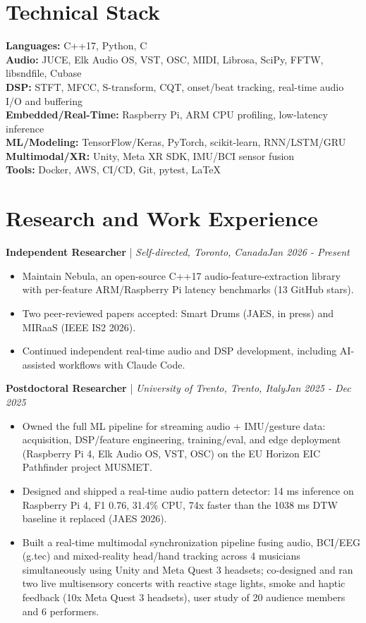 \documentclass[11pt]{article}
\newenvironment{cvrole}[5]{%
  \par\noindent\textbf{\large #1} | \textit{\small #2, #3}\hfill \textit{\small #4 - #5}\par
  \begin{itemize}[leftmargin=2em, itemsep=-0.3em, topsep=-0.5em]%
}{%
  \end{itemize}\par\noindent\mbox{}\par\vspace{0.1em}%
}
\begin{document}
\section*{Technical Stack}
\textbf{Languages:} C++17, Python, C \\
\textbf{Audio:} JUCE, Elk Audio OS, VST, OSC, MIDI, Librosa, SciPy, FFTW, libsndfile, Cubase \\
\textbf{DSP:} STFT, MFCC, S-transform, CQT, onset/beat tracking, real-time audio I/O and buffering \\
\textbf{Embedded/Real-Time:} Raspberry Pi, ARM CPU profiling, low-latency inference \\
\textbf{ML/Modeling:} TensorFlow/Keras, PyTorch, scikit-learn, RNN/LSTM/GRU \\
\textbf{Multimodal/XR:} Unity, Meta XR SDK, IMU/BCI sensor fusion \\
\textbf{Tools:} Docker, AWS, CI/CD, Git, pytest, LaTeX

\section*{Research and Work Experience}

\begin{cvrole}{Independent Researcher}{Self-directed}{Toronto, Canada}{Jan 2026}{Present}
\item Maintain Nebula, an open-source C++17 audio-feature-extraction library with per-feature ARM/Raspberry Pi latency benchmarks (13 GitHub stars).
\item Two peer-reviewed papers accepted: Smart Drums (JAES, in press) and MIRaaS (IEEE IS2 2026).
\item Continued independent real-time audio and DSP development, including AI-assisted workflows with Claude Code.
\end{cvrole}

\begin{cvrole}{Postdoctoral Researcher}{University of Trento}{Trento, Italy}{Jan 2025}{Dec 2025}
\item Owned the full ML pipeline for streaming audio + IMU/gesture data: acquisition, DSP/feature engineering, training/eval, and edge deployment (Raspberry Pi 4, Elk Audio OS, VST, OSC) on the EU Horizon EIC Pathfinder project MUSMET.
\item Designed and shipped a real-time audio pattern detector: 14 ms inference on Raspberry Pi 4, F1 0.76, 31.4\% CPU, 74x faster than the 1038 ms DTW baseline it replaced (JAES 2026).
\item Built a real-time multimodal synchronization pipeline fusing audio, BCI/EEG (g.tec) and mixed-reality head/hand tracking across 4 musicians simultaneously using Unity and Meta Quest 3 headsets; co-designed and ran two live multisensory concerts with reactive stage lights, smoke and haptic feedback (10x Meta Quest 3 headsets), user study of 20 audience members and 6 performers.
\end{cvrole}
\end{document}
